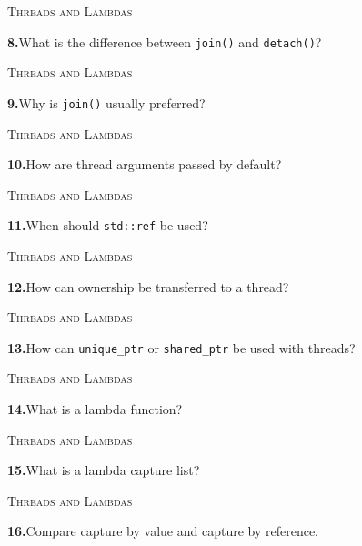 \documentclass[11pt,a4paper]{article}
\newenvironment{questionblock}{%
  \begin{minipage}[t][0.455\textheight][t]{\textwidth}%
  \raggedright\small
}{%
  \vfill
  \end{minipage}%
}
\newcommand{\sectionlabel}[1]{\textsc{#1}\par\vspace{0.35em}}
\newcommand{\questionnumber}[1]{\textbf{#1.}\enspace}
\begin{document}
\vspace*{0.04\textheight}
\begin{questionblock}
\sectionlabel{Threads and Lambdas}
\questionnumber{8}What is the difference between \verb|join()| and \verb|detach()|?\par
\end{questionblock}
\newpage
\begin{questionblock}
\sectionlabel{Threads and Lambdas}
\questionnumber{9}Why is \verb|join()| usually preferred?\par
\end{questionblock}
\vspace*{0.04\textheight}
\begin{questionblock}
\sectionlabel{Threads and Lambdas}
\questionnumber{10}How are thread arguments passed by default?\par
\end{questionblock}
\newpage
\begin{questionblock}
\sectionlabel{Threads and Lambdas}
\questionnumber{11}When should \verb|std::ref| be used?\par
\end{questionblock}
\vspace*{0.04\textheight}
\begin{questionblock}
\sectionlabel{Threads and Lambdas}
\questionnumber{12}How can ownership be transferred to a thread?\par
\end{questionblock}
\newpage
\begin{questionblock}
\sectionlabel{Threads and Lambdas}
\questionnumber{13}How can \verb|unique_ptr| or \verb|shared_ptr| be used with threads?\par
\end{questionblock}
\vspace*{0.04\textheight}
\begin{questionblock}
\sectionlabel{Threads and Lambdas}
\questionnumber{14}What is a lambda function?\par
\end{questionblock}
\newpage
\begin{questionblock}
\sectionlabel{Threads and Lambdas}
\questionnumber{15}What is a lambda capture list?\par
\end{questionblock}
\vspace*{0.04\textheight}
\begin{questionblock}
\sectionlabel{Threads and Lambdas}
\questionnumber{16}Compare capture by value and capture by reference.\par
\end{questionblock}
\end{document}
